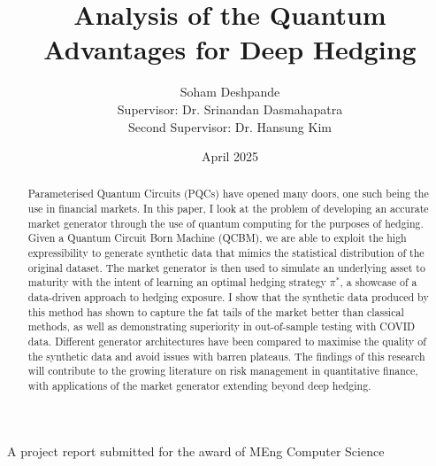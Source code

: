 \documentclass[12pt]{article}
\title{Analysis of the Quantum Advantages for Deep Hedging}
\author{Soham Deshpande\\Supervisor: Dr. Srinandan Dasmahapatra
\\Second Supervisor: Dr. Hansung Kim}
\date{April 2025}
\newcommand{\detailtexcount}[1]{%
  \immediate\write18{texcount -merge #1.tex > #1.wcdetail }%
}
\numberwithin{equation}{section}
\begin{document}
\maketitle
\vspace{10cm}
\begin{centering}
A project report submitted for the award of MEng Computer Science
\end{centering}
\thispagestyle{empty}







\clearpage


\begin{abstract}
Parameterised Quantum Circuits (PQCs) have opened many doors, one 
such being the use in financial markets. In this paper, I look at the problem 
of developing an accurate market generator through the use of quantum computing
for the purposes of hedging. 
Given a Quantum Circuit Born Machine (QCBM), we are able to exploit the high 
expressibility to generate synthetic 
data that mimics the statistical distribution of the original dataset. The market 
generator is then used to simulate an 
underlying asset to maturity with the intent of learning an optimal hedging strategy 
$\pi^*$, a showcase of a data-driven approach to hedging exposure. I show that 
the synthetic 
data produced by this method has shown to capture the fat tails of the market 
better than classical methods, as well as demonstrating superiority in 
out-of-sample testing with COVID data. Different generator 
architectures have been compared to maximise the quality of the synthetic data 
and avoid issues with barren plateaus. 
The findings of 
this research will contribute to the growing literature on risk management in 
quantitative finance, with applications of the market generator extending beyond 
deep hedging. 
\end{abstract}

\clearpage


\tableofcontents
\clearpage



\end{document}
